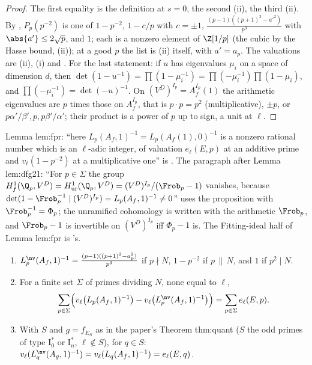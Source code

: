 \begin{proof}
The first equality is the definition at $s=0$, the second (ii), the third (ii). By ,
$P_p(p^{-2})$ is one of $1-p^{-2}$, $1-c/p$ with $c=\pm1$, $\frac{(p-1)((p+1)^2-a'^2)}{p^3}$ with $\abs{a'}\le2\sqrt p$, and $1$; each is a nonzero element of $\Z[1/p]$ (the cubic by the Hasse
bound, (ii)); at a good $p$ the list is (ii) itself, with $a'=a_p$. The valuations are
(ii), (i) and . For the last statement: if $u$ has
eigenvalues $\mu_i$ on a space of dimension $d$, then $\det(1-u^{-1})=\prod(1-\mu_i^{-1})=\prod(-\mu_i^{-1})\prod(1-\mu_i)$, and $\prod(-\mu_i^{-1})=\det(-u)^{-1}$. On $(V^D)^{I_p}=A_f^{I_p}(1)$
the arithmetic eigenvalues are $p$ times those on $A_f^{I_p}$, that is $p\cdot p=p^2$ (multiplicative), $\pm p$, or $p\alpha'/\beta',p,p\beta'/\alpha'$; their product is a power of $p$ up to
sign, a unit at $\ell$.
\end{proof}

\begin{paperlink}
Lemma lem:fpr: ``here $L_p(A_f,1)^{-1}=L_p(A_f(1),0)^{-1}$ is a nonzero rational number which is an $\ell$-adic integer, of valuation $e_\ell(E,p)$ at an additive prime and $v_\ell(1-p^{-2})$
at a multiplicative one'' is . The paragraph after Lemma lem:dfg21: ``For $p\in\Sigma$ the group
$H^1_f(\Q_p,V^D)=H^1_{\mathrm{ur}}(\Q_p,V^D)=(V^D)^{I_p}/(\Frob_p-1)$ vanishes, because $\det(1-\Frob_p^{-1}\mid(V^D)^{I_p})=L_p(A_f,1)^{-1}\ne0$'' uses the proposition with
$\Frob_p^{-1}=\Phi_p$; the unramified cohomology is written with the arithmetic $\Frob_p$, and $\Frob_p-1$ is invertible on $(V^D)^{I_p}$ iff $\Phi_p-1$ is. The Fitting-ideal half of
Lemma lem:fpr is 's.
\end{paperlink}

\begin{proposition}[the naive factors at $s=1$]\label{prop:lfunctions:naive-factors}
\begin{enumerate}[label=(\roman*)]
\item $L_p^{\nv}(A_f,1)^{-1}=\frac{(p-1)((p+1)^2-a_p^2)}{p^3}$ if $p\nmid N$, $1-p^{-2}$ if $p\,\|\,N$, and $1$ if $p^2\mid N$.
\item For a finite set $\Sigma$ of primes dividing $N$, none equal to $\ell$,
\[
\sum_{p\in\Sigma}\Bigl(v_\ell\bigl(L_p(A_f,1)^{-1}\bigr)-v_\ell\bigl(L_p^{\nv}(A_f,1)^{-1}\bigr)\Bigr)=\sum_{p\in\Sigma}e_\ell(E,p).
\]
\item With $S$ and $g=f_{E_S}$ as in the paper's Theorem thm:quant ($S$ the odd primes of type $\mathrm I_0^*$ or $\mathrm I_n^*$, $\ell\notin S$), for $q\in S$:
$v_\ell(L_q^{\nv}(A_g,1)^{-1})=v_\ell(L_q(A_f,1)^{-1})=e_\ell(E,q)$.
\end{enumerate}
\end{proposition}

